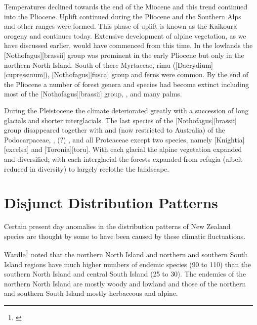 Temperatures declined towards the end of the Miocene and this trend continued into the Pliocene.
Uplift continued during the Pliocene and the Southern Alps and other ranges were formed.
This phase of uplift is known as the Kaikoura orogeny and continues today.
Extensive development of alpine vegetation, as we have discussed earlier, would have commenced from this time.
In the lowlands the [Nothofagus][brassii] group was prominent in the early Pliocene but only in the northern North Island.
South of there Myrtaceae, rimu ([Dacrydium][cupressinum]),  [Nothofagus][fusca] group and ferns were common.
By the end of the Pliocene a number of forest genera and species had become extinct including most of the [Nothofagus][brassii] group, ,  and many palms.

During the Pleistocene the climate deteriorated greatly with a succession of long glacials and shorter interglacials.
The last species of the [Nothofagus][brassii] group disappeared together with  and  (now restricted to Australia) of the Podocarpaceae, , (?) ,  and all Proteaceae except two species, namely [Knightia][excelsa] and [Toronia][toru].
With each glacial the alpine vegetation expanded and diversified; with each interglacial the forests expanded from refugia (albeit reduced in diversity) to largely reclothe the landscape.

\section{Disjunct Distribution Patterns}

Certain present day anomalies in the distribution patterns of New Zealand species are thought by some to have been caused by these climatic fluctuations.

Wardle\footnote{\cite{wardle1963evolution}} noted that the northern North Island and northern and southern South Island regions have much higher numbers of endemic species (90 to 110) than the southern North Island and central South Island (25 to 30).
The endemics of the northern North Island are mostly woody and lowland and those of the northern and southern South Island mostly herbaceous and alpine.

